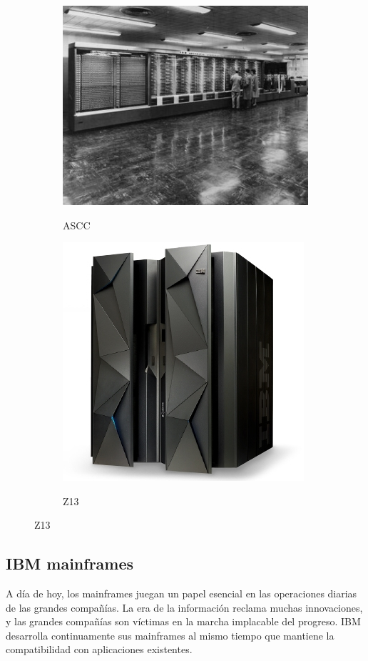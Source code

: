 \documentclass[paper=a4, fontsize=10pt]{scrartcl} %
\numberwithin{equation}{section} %
\numberwithin{figure}{section} %
\numberwithin{table}{section} %
\begin{document}
\begin{figure}[H]
	\centering
	\begin{subfigure}{.5\textwidth}
		\centering
		\href{https://www-03.ibm.com/ibm/history/exhibits/markI/markI_intro.html}{		\includegraphics[width=.75\linewidth]{./Imagenes/ascc.jpg}}
		\caption{ASCC}
		\label{fig:ascc}
	\end{subfigure}%
	\begin{subfigure}{.5\textwidth}
		\centering
		\href{https://www-03.ibm.com/systems/z/hardware/z13.html}{\includegraphics[width=.75\linewidth]{./Imagenes/z13.jpg}}
		\caption{Z13}
		\label{fig:z13}
	\end{subfigure}
\end{figure}



\subsection{IBM mainframes}
A día de hoy, los mainframes juegan un papel esencial en las operaciones diarias de las grandes compañías.
La era de la información reclama muchas innovaciones, y las grandes compañías son víctimas en la marcha implacable del progreso.
IBM desarrolla continuamente sus mainframes al mismo tiempo que mantiene la compatibilidad con aplicaciones existentes.
\end{document}
